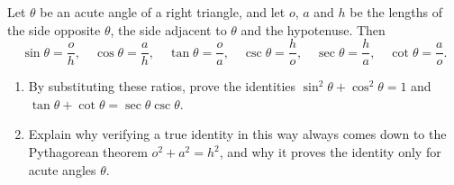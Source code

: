 Let $\theta$ be an acute angle of a right triangle, and let $o$, $a$ and $h$ be the lengths of the side opposite $\theta$, the side adjacent to $\theta$ and the hypotenuse. Then
\[\sin\theta=\dfrac oh,\quad\cos\theta=\dfrac ah,\quad\tan\theta=\dfrac oa,\quad\csc\theta=\dfrac ho,\quad\sec\theta=\dfrac ha,\quad\cot\theta=\dfrac ao.\]
\begin{enumerate}
\item[(a)] By substituting these ratios, prove the identities $\sin^2\theta+\cos^2\theta=1$ and $\tan\theta+\cot\theta=\sec\theta\csc\theta$.
\item[(b)] Explain why verifying a true identity in this way always comes down to the Pythagorean theorem $o^2+a^2=h^2$, and why it proves the identity only for acute angles $\theta$.
\end{enumerate}
